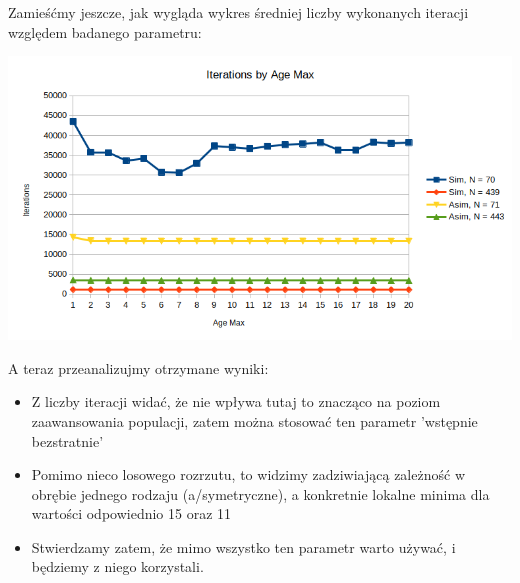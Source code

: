 \documentclass{article}
\begin{document}
Zamieśćmy jeszcze, jak wygląda wykres średniej liczby wykonanych iteracji względem badanego parametru:

\includegraphics[scale=0.72]{ageIter}

\newpage
A teraz przeanalizujmy otrzymane wyniki:
\begin{itemize}
	\item Z liczby iteracji widać, że nie wpływa tutaj to znacząco na poziom zaawansowania populacji, zatem można stosować ten parametr 'wstępnie bezstratnie'
	\item Pomimo nieco losowego rozrzutu, to widzimy zadziwiającą zależność w obrębie jednego rodzaju (a/symetryczne), a konkretnie lokalne minima dla wartości odpowiednio 15 oraz 11
	\item Stwierdzamy zatem, że mimo wszystko ten parametr warto używać, i będziemy z niego korzystali.
\end{itemize}
\end{document}
